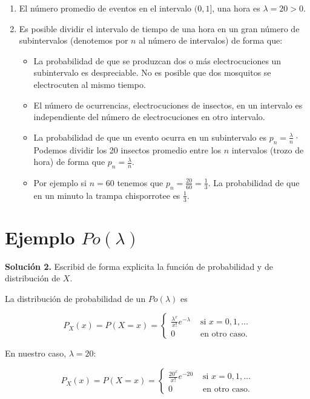 \documentclass[
  letterpaper,
  DIV=11,
  numbers=noendperiod]{scrreprt}
\providecommand{\tightlist}{%
  \setlength{\itemsep}{0pt}\setlength{\parskip}{0pt}}\usepackage{longtable,booktabs,array}
\begin{document}
\begin{enumerate}
\def\labelenumi{\arabic{enumi}.}
\tightlist
\item
  El número promedio de eventos en el intervalo \((0,1]\), una hora es
  \(\lambda=20>0\).
\item
  Es posible dividir el intervalo de tiempo de una hora en un gran
  número de subintervalos (denotemos por \(n\) al número de intervalos)
  de forma que:

  \begin{itemize}
  \tightlist
  \item
    La probabilidad de que se produzcan dos o más electrocuciones un
    subintervalo es despreciable. No es posible que dos mosquitos se
    electrocuten al mismo tiempo.
  \item
    El número de ocurrencias, electrocuciones de insectos, en un
    intervalo es independiente del número de electrocuciones en otro
    intervalo.
  \item
    La probabilidad de que un evento ocurra en un subintervalo es
    \(p_n=\frac{\lambda}{n}\)· Podemos dividir los 20 insectos promedio
    entre los \(n\) intervalos (trozo de hora) de forma que
    \(p_n=\frac{\lambda}{n}\).
  \item
    Por ejemplo si \(n=60\) tenemos que
    \(p_n=\frac{20}{60}=\frac{1}{3}\). La probabilidad de que en un
    minuto la trampa chisporrotee es \(\frac{1}{3}\).
  \end{itemize}
\end{enumerate}

\section{\texorpdfstring{Ejemplo
\(Po(\lambda)\)}{Ejemplo Po(\textbackslash lambda)}}\label{ejemplo-polambda-2}

\textbf{Solución 2.} Escribid de forma explicita la función de
probabilidad y de distribución de \(X\).

La distribución de probabilidad de un \(Po(\lambda)\) es

\[
P_X(x)=P(X=x)=\left\{\begin{array}{ll}  \frac{\lambda^x}{x!}e^{-\lambda} & \mbox{ si } x=0,1,\ldots\\ 0  & \mbox{ en otro caso.}\end{array}\right.
\]

En nuestro caso, \(\lambda =20\):

\[
P_X(x)=P(X=x)=\left\{\begin{array}{ll}\frac{20^x}{x!}e^{-20} & \mbox{ si } x=0,1,\ldots\\ 0  & \mbox{ en otro caso.}\end{array}\right.
\]
\end{document}
